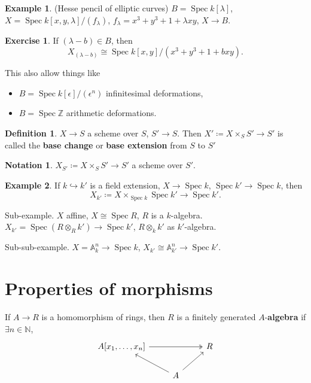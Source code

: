 \documentclass[12pt]{article}
\DeclareMathOperator{\Spec}{Spec}
\theoremstyle{definition}
\newtheorem*{definition}{Definition}
\newtheorem*{notation}{Notation}
\newtheorem*{exercise}{Exercise}
\newtheorem*{example}{Example}
\theoremstyle{remark}
\begin{document}
\begin{example}
(Hesse pencil of elliptic curves) $B=\Spec k[\lambda]$, $X=\Spec k[x,y,\lambda]/(f_{\lambda})$, $f_{\lambda}=x^3+y^3+1+\lambda xy$, $X\rightarrow B$.

\begin{exercise}
If $(\lambda-b)\in B$, then
\[X_{(\lambda-b)}\cong\Spec k[x,y]/(x^3+y^3+1+bxy).\]
\end{exercise}

This also allow things like
\begin{itemize}
\item $B=\Spec k[\epsilon]/(\epsilon^n)$ infinitesimal deformations,
\item $B=\Spec\mathbb{Z}$ arithmetic deformations.
\end{itemize}
\end{example}

\begin{definition}
$X\rightarrow S$ a scheme over $S$, $S'\rightarrow S$. Then $X'\coloneqq X\times_SS'\rightarrow S'$ is called the \textbf{base change} or \textbf{base extension} from $S$ to $S'$
\end{definition}

\begin{notation}
$X_{S'}\coloneqq X\times_SS'\rightarrow S'$ a scheme over $S'$.
\end{notation}

\begin{example}
If $k\hookrightarrow k'$ is a field extension, $X\rightarrow\Spec k$, $\Spec k'\rightarrow\Spec k$, then
\[X_{k'}\coloneqq X\times_{\Spec k}\Spec k'\longrightarrow\Spec k'.\]

Sub-example. $X$ affine, $X\cong\Spec R$, $R$ is a $k$-algebra. $X_{k'}=\Spec(R\otimes_Rk')\rightarrow\Spec k'$, $R\otimes_kk'$ as $k'$-algebra.

Sub-sub-example. $X=\mathbb{A}_k^n\rightarrow\Spec k$, $X_{k'}\cong\mathbb{A}_{k'}^n\rightarrow\Spec k'$.
\end{example}

\section{Properties of morphisms}
If $A\rightarrow R$ is a homomorphism of rings, then $R$ is a finitely generated $A$-\textbf{algebra} if $\exists n\in\mathbb{N}$,
\[
\begin{tikzcd}
A[x_1,\ldots,x_n]\arrow[rr,two heads]&&R\\
&A\arrow[lu]\arrow[ru]
\end{tikzcd}
\]
\end{document}
